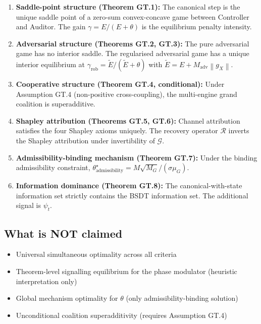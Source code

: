 \documentclass[11pt,a4paper]{article}
\theoremstyle{definition}
\newcommand{\norm}[1]{\left\|#1\right\|}
\newcommand{\gX}{g_X}
\newcommand{\adv}{\mathrm{adv}}
\newcommand{\rob}{\mathrm{rob}}
\begin{document}
\begin{enumerate}
\item \textbf{Saddle-point structure (Theorem GT.1):}
The canonical step is the unique saddle point of a zero-sum convex-concave game between Controller and Auditor.
The gain $\gamma = E/(E+\theta)$ is the equilibrium penalty intensity.

\item \textbf{Adversarial structure (Theorems GT.2, GT.3):}
The pure adversarial game has no interior saddle. The regularised adversarial game has a unique interior equilibrium
at $\gamma_\rob = \tilde E/(\tilde E + \theta)$ with $\tilde E = E + M_\adv\norm{\gX}$.

\item \textbf{Cooperative structure (Theorem GT.4, conditional):}
Under Assumption GT.4 (non-positive cross-coupling), the multi-engine grand coalition is superadditive.

\item \textbf{Shapley attribution (Theorems GT.5, GT.6):}
Channel attribution satisfies the four Shapley axioms uniquely.
The recovery operator $\mathcal{R}$ inverts the Shapley attribution under invertibility of $\mathcal{G}$.

\item \textbf{Admissibility-binding mechanism (Theorem GT.7):}
Under the binding admissibility constraint, $\theta^\star_\text{admissibility} = M\sqrt{M_G}/(\sigma\mu_G)$.

\item \textbf{Information dominance (Theorem GT.8):}
The canonical-with-state information set strictly contains the BSDT information set.
The additional signal is $\psi_t$.
\end{enumerate}

\subsection{What is NOT claimed}

\begin{itemize}
\item Universal simultaneous optimality across all criteria
\item Theorem-level signalling equilibrium for the phase modulator (heuristic interpretation only)
\item Global mechanism optimality for $\theta$ (only admissibility-binding solution)
\item Unconditional coalition superadditivity (requires Assumption GT.4)
\end{itemize}
\end{document}
